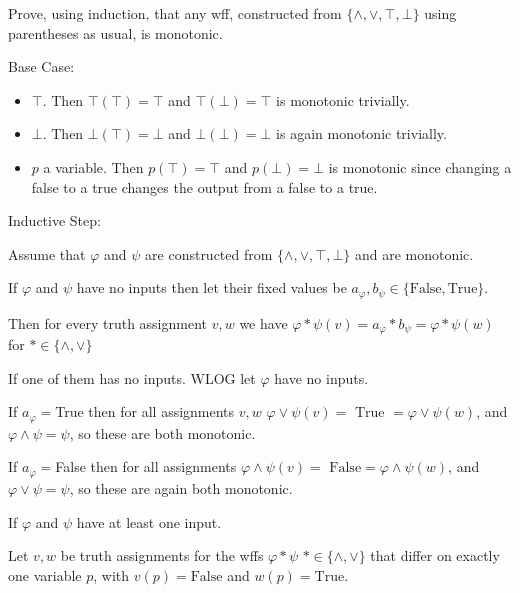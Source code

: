 \documentclass[12pt, letterpaper]{article}
\renewcommand{\t}[1]{\text{#1}}
\begin{document}
\color{\TextColor}
\pagecolor{\colormode}
\setlength{\parindent}{0pt}
\pagestyle{fancy}
\fancyhf{}

\begin{problem}{}
   Prove, using induction, that any wff, constructed from $\{\land, \lor, \top, \bot\}$ using parentheses as usual, is monotonic. 
\end{problem}
\begin{problemproof}
    Base Case:
    \begin{itemize}
        \item $\top$. Then $\top(\top) = \top$ and $\top(\bot) = \top$ is monotonic trivially.
        \item $\bot$. Then $\bot(\top) = \bot$ and $\bot(\bot) = \bot$ is again monotonic trivially.
        \item $p$ a variable. Then $p(\top) = \top$ and $p(\bot) = \bot$ is monotonic since changing a false to a true changes the output from a false to a true.
    \end{itemize}

    Inductive Step:

    Assume that $\varphi$ and $\psi$ are constructed from $\{\land, \lor, \top, \bot\}$ and are monotonic.

    If $\varphi$ and $\psi$ have no inputs then let their fixed values be $a_{\varphi}, b_\psi \in \{\t{False}, \t{True}\}$.

    Then for every truth assignment $v,w$ we have $\varphi * \psi(v) = a_\varphi * b_\psi = \varphi * \psi(w)$ for $* \in \{\land, \lor\}$

    If one of them has no inputs. WLOG let $\varphi$ have no inputs. 
    
    If $a_\varphi =$True then for all assignments $v,w$ $\varphi \lor \psi(v)=\t{ True }=\varphi \lor \psi(w)$, and $\varphi \land \psi = \psi$, so these are both monotonic.

    If $a_\varphi =$False then for all assignments $\varphi \land \psi(v)= \t{ False} = \varphi \land \psi(w)$, and $\varphi \lor \psi = \psi$, so these are again both monotonic.

    If $\varphi$ and $\psi$ have at least one input.

    Let $v,w$ be truth assignments for the wffs $\varphi * \psi$ $* \in \{\land, \lor\}$ that differ on exactly one variable $p$, with $v(p)=\t{False}$ and $w(p)=\t{True}$.


\end{problemproof}
\end{document}
